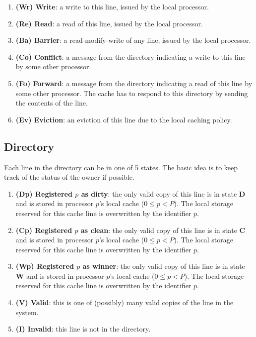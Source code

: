 \documentclass{article}
\begin{document}
\begin{enumerate}
\item \textbf{(Wr) Write}: a write to this line, issued by the local processor.
\item \textbf{(Re) Read}: a read of this line, issued by the local processor.
\item \textbf{(Ba) Barrier}: a read-modify-write of any line, issued by the local processor.
\item \textbf{(Co) Conflict}: a message from the directory indicating a write to this line by some other processor.
\item \textbf{(Fo) Forward}: a message from the directory indicating a read of this line by some other processor. The cache has to respond to this directory by sending the contents of the line.
\item \textbf{(Ev) Eviction}: an eviction of this line due to the local caching policy.
\end{enumerate}

\subsection{Directory}
Each line in the directory can be in one of 5 states. The basic idea is to keep track of the status of the owner if possible.

\begin{enumerate}
\item \textbf{(Dp) Registered $p$ as dirty}: the only valid copy of this line is in state \textbf{D} and is stored in processor $p$'s local cache ($0 \leq p < P$). The local storage reserved for this cache line is overwritten by the identifier $p$.
\item \textbf{(Cp) Registered $p$ as clean}: the only valid copy of this line is in state \textbf{C} and is stored in processor $p$'s local cache ($0 \leq p < P$). The local storage reserved for this cache line is overwritten by the identifier $p$.
\item \textbf{(Wp) Registered $p$ as winner}: the only valid copy of this line is in state \textbf{W} and is stored in processor $p$'s local cache ($0 \leq p < P$). The local storage reserved for this cache line is overwritten by the identifier $p$.
\item \textbf{(V) Valid}: this is one of (possibly) many valid copies of the line in the system.
\item \textbf{(I) Invalid}: this line is not in the directory.
\end{enumerate}
\end{document}
